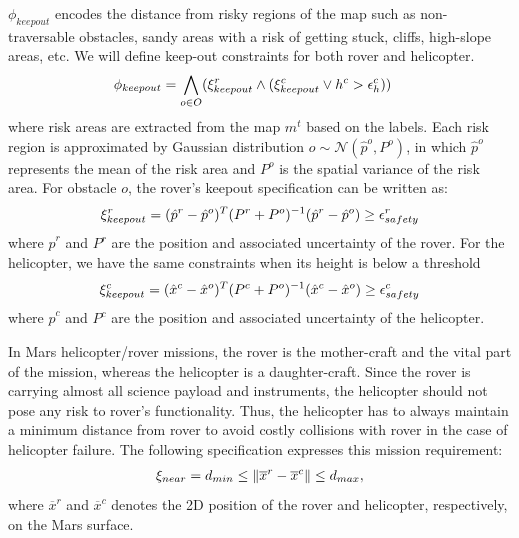 \documentclass[conference]{IEEEtran}
\newcommand{\cristi}[1]{{\color{orange} [Cristi] #1}}
\begin{document}
	\noindent{}
	$\phi_{keepout}$ encodes the distance from risky regions of the map such as non-traversable obstacles, sandy areas with a risk of getting stuck, cliffs, high-slope areas, etc. We will define keep-out constraints for both rover and helicopter.
	\begin{align}
	   \phi_{keepout} &= \bigwedge_{o\in O} (\xi_{keepout}^r \land (\xi_{keepout}^c \lor h^c > \epsilon_{h}^c))
	\end{align}
	where risk areas are extracted from the map $m^t$ based on the labels. Each risk region is approximated by Gaussian distribution $o \sim\mathcal{N}(\hat{p}^o, P^o)$, in which $\hat{p}^o$ represents the mean of the risk area and $P^o$ is the spatial variance of the risk area. For obstacle $o$, the rover's keepout specification can be written as:
	{\small
	\begin{align}
    	\xi_{keepout}^r = (\hat{p}^r-\hat{p}^o)^T(P^r+P^o)^{-1}(\hat{p}^r-\hat{p}^o) \geq \epsilon_{safety}^r
	\end{align}
	}%
	where $\hat{p}^r$ and $P^r$ are the position and associated uncertainty of the rover. For the helicopter, we have the same constraints when its height is below a threshold
	{\small
	\begin{align}
    	\xi_{keepout}^c = (\hat{x}^c-\hat{x}^o)^T(P^c+P^o)^{-1}(\hat{x}^c-\hat{x}^o) \geq \epsilon_{safety}^c
	\end{align}
	}%
	where $\hat{p}^c$ and $P^c$ are the position and associated uncertainty of the helicopter.
    
\noindent{} In Mars helicopter/rover missions, the rover is the mother-craft and the vital part of the mission, whereas the helicopter is a daughter-craft. Since the rover is carrying almost all science payload and instruments, the helicopter should not pose any risk to rover's functionality. Thus, the helicopter has to always maintain a minimum distance from rover to avoid costly collisions with rover in the case of helicopter failure. The following specification expresses this mission requirement:
 	\begin{align}
 	    \xi_{near} = d_{min} \leq \left\| {\overline{x}^r - \overline{x}^c} \right\| \leq d_{max},
 	\end{align}
    where $\overline{x}^r$ and $\overline{x}^c$ denotes the 2D position of the rover and helicopter, respectively, on the Mars surface.
\end{document}
